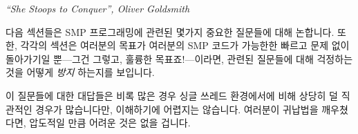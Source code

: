 
%
	 {\emph{``She Stoops to Conquer'', Oliver Goldsmith}}

다음 섹션들은 SMP 프로그래밍에 관련된 몇가지 중요한 질문들에 대해 논합니다.
또한, 각각의 섹션은 여러분의 목표가 여러분의 SMP 코드가 가능한한 빠르고 문제
없이 돌아가기일 뿐---그건 그렇고, 훌륭한 목표죠!---이라면, 관련된 질문들에 대해
걱정하는 것을 어떻게 {\em 방지} 하는지를 보입니다.

이 질문들에 대한 대답들은 비록 많은 경우 싱글 쓰레드 환경에서에 비해 상당히 덜
직관적인 경우가 많습니다만, 이해하기에 어렵지는 않습니다.
여러분이 귀납법을 깨우쳤다면, 압도적일 만큼 어려운 것은 없을 겁니다.
\iffalse

The following sections discuss some important questions relating to
SMP programming.
Each section also shows how to {\em avoid} having to worry about
the corresponding question, which can be extremely important if
your goal is to simply get your SMP code working as quickly and
painlessly as possible---which is an excellent goal, by the way!

Although the answers to these questions are often quite a bit less
intuitive than they would be in a single-threaded setting,
with a bit of work, they are not that difficult to understand.
If you managed to master recursion, there is nothing in here that should
pose an overwhelming challenge.
\fi






